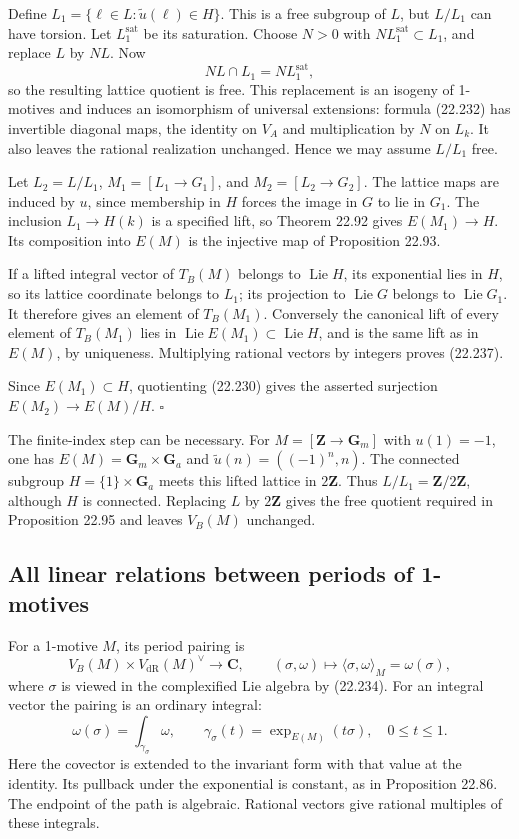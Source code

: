 \documentclass[
  11pt,
  a4paper,
]{article}
\begin{document}
Define \(L_1=\{\ell\in L:\widetilde u(\ell)\in H\}\). This is a free
subgroup of \(L\), but \(L/L_1\) can have torsion. Let
\(L_1^{\mathrm{sat}}\) be its saturation. Choose \(N>0\) with
\(NL_1^{\mathrm{sat}}\subset L_1\), and replace \(L\) by \(NL\). Now \[
 NL\cap L_1=NL_1^{\mathrm{sat}},
\] so the resulting lattice quotient is free. This replacement is an
isogeny of 1-motives and induces an isomorphism of universal extensions:
formula (22.232) has invertible diagonal maps, the identity on \(V_A\)
and multiplication by \(N\) on \(L_k\). It also leaves the rational
realization unchanged. Hence we may assume \(L/L_1\) free.

Let \(L_2=L/L_1\), \(M_1=[L_1\to G_1]\), and \(M_2=[L_2\to G_2]\). The
lattice maps are induced by \(u\), since membership in \(H\) forces the
image in \(G\) to lie in \(G_1\). The inclusion \(L_1\to H(k)\) is a
specified lift, so Theorem 22.92 gives \(E(M_1)\to H\). Its composition
into \(E(M)\) is the injective map of Proposition 22.93.

If a lifted integral vector of \(T_B(M)\) belongs to
\(\operatorname{Lie}H\), its exponential lies in \(H\), so its lattice
coordinate belongs to \(L_1\); its projection to \(\operatorname{Lie}G\)
belongs to \(\operatorname{Lie}G_1\). It therefore gives an element of
\(T_B(M_1)\). Conversely the canonical lift of every element of
\(T_B(M_1)\) lies in
\(\operatorname{Lie}E(M_1)\subset\operatorname{Lie}H\), and is the same
lift as in \(E(M)\), by uniqueness. Multiplying rational vectors by
integers proves (22.237).

Since \(E(M_1)\subset H\), quotienting (22.230) gives the asserted
surjection \(E(M_2)\to E(M)/H\). \(\square\)

The finite-index step can be necessary. For
\(M=[\mathbf Z\to\mathbf G_m]\) with \(u(1)=-1\), one has
\(E(M)=\mathbf G_m\times\mathbf G_a\) and
\(\widetilde u(n)=((-1)^n,n)\). The connected subgroup
\(H=\{1\}\times\mathbf G_a\) meets this lifted lattice in
\(2\mathbf Z\). Thus \(L/L_1=\mathbf Z/2\mathbf Z\), although \(H\) is
connected. Replacing \(L\) by \(2\mathbf Z\) gives the free quotient
required in Proposition 22.95 and leaves \(V_B(M)\) unchanged.

\subsection{All linear relations between periods of
1-motives}\label{all-linear-relations-between-periods-of-1-motives}

For a 1-motive \(M\), its period pairing is \[
 V_B(M)\times V_{\mathrm{dR}}(M)^\vee\longrightarrow\mathbf C,
 \qquad(\sigma,\omega)\longmapsto
       \langle\sigma,\omega\rangle_M=\omega(\sigma),
 \tag{22.238}
\] where \(\sigma\) is viewed in the complexified Lie algebra by
(22.234). For an integral vector the pairing is an ordinary integral: \[
 \omega(\sigma)=\int_{\gamma_\sigma}\omega,\qquad
 \gamma_\sigma(t)=\exp_{E(M)}(t\sigma),\quad0\le t\le1.
 \tag{22.239}
\] Here the covector is extended to the invariant form with that value
at the identity. Its pullback under the exponential is constant, as in
Proposition 22.86. The endpoint of the path is algebraic. Rational
vectors give rational multiples of these integrals.
\end{document}
